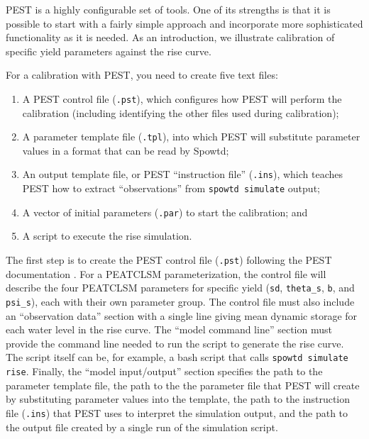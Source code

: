 \documentclass[11pt,a4paper]{article}
\begin{document}
PEST is a highly configurable set of tools.  One of its strengths is
that it is possible to start with a fairly simple approach and
incorporate more sophisticated functionality as it is needed.  As an
introduction, we illustrate calibration of specific yield parameters
against the rise curve.

For a calibration with PEST, you need to create five text files:
\begin{enumerate}
\item A PEST control file (\texttt{.pst}), which configures how PEST
  will perform the calibration (including identifying the other files
  used during calibration);
\item A parameter template file (\texttt{.tpl}), into which PEST will
  substitute parameter values in a format that can be read by Spowtd;
\item An output template file, or PEST ``instruction file''
  (\texttt{.ins}), which teaches PEST how to extract ``observations''
  from \texttt{spowtd simulate} output;
\item A vector of initial parameters (\texttt{.par}) to start the
  calibration; and
\item A script to execute the rise simulation.
\end{enumerate}

The first step is to create the PEST control file (\texttt{.pst})
following the PEST documentation \citep{Doherty_2010}.  For a PEATCLSM
parameterization, the control file will describe the four PEATCLSM
parameters for specific yield (\texttt{sd}, \texttt{theta\_s},
\texttt{b}, and \texttt{psi\_s}), each with their own parameter group.
The control file must also include an ``observation data'' section
with a single line giving mean dynamic storage for each water level in
the rise curve. The ``model command line'' section must provide the
command line needed to run the script to generate the rise curve.  The
script itself can be, for example, a bash script that calls
\texttt{spowtd simulate rise}.  Finally, the ``model input/output''
section specifies the path to the parameter template file, the path to
the the parameter file that PEST will create by substituting parameter
values into the template, the path to the instruction file
(\texttt{.ins}) that PEST uses to interpret the simulation output, and
the path to the output file created by a single run of the simulation
script.
\end{document}
